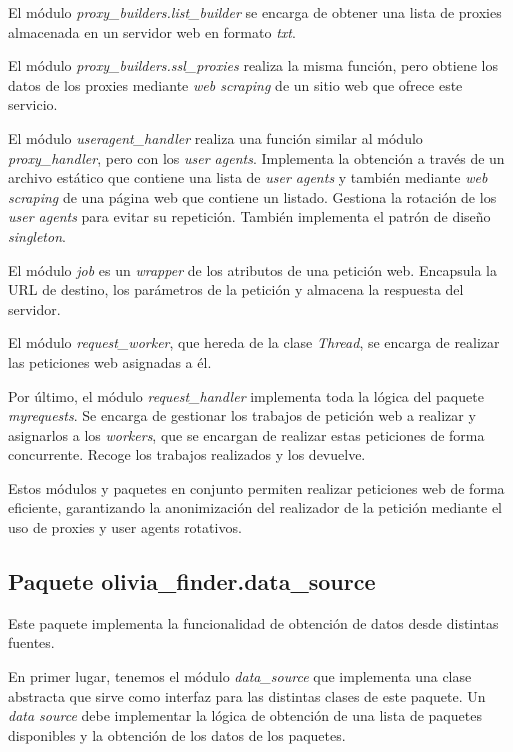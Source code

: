 El módulo \textit{proxy\_builders.list\_builder} se encarga de obtener una lista de proxies almacenada en un
 servidor web en formato \textit{txt}.

El módulo \textit{proxy\_builders.ssl\_proxies} realiza la misma función, pero obtiene los datos de los 
proxies mediante \textit{web scraping} de un sitio web que ofrece este servicio.

El módulo \textit{useragent\_handler} realiza una función similar al 
módulo \textit{proxy\_handler}, pero con los \textit{user agents}. Implementa la obtención a 
través de un archivo estático que contiene una lista de \textit{user agents} y también mediante \textit{web scraping} de una página web que contiene un listado. Gestiona la rotación de los \textit{user agents} para evitar su repetición. También implementa el patrón de diseño \textit{singleton}.

El módulo \textit{job} es un \textit{wrapper} de los atributos de una petición web. 
Encapsula la URL de destino, los parámetros de la petición y almacena la respuesta del servidor.

El módulo \textit{request\_worker}, que hereda de la clase \textit{Thread}, se encarga de 
realizar las peticiones web asignadas a él.

Por último, el módulo \textit{request\_handler} implementa toda la lógica del 
paquete \textit{myrequests}. Se encarga de gestionar los trabajos de petición web a realizar y 
asignarlos a los \textit{workers}, que se encargan de realizar estas peticiones de forma concurrente. 
Recoge los trabajos realizados y los devuelve.

Estos módulos y paquetes en conjunto permiten realizar peticiones web de forma eficiente, 
garantizando la anonimización del realizador de la petición mediante el uso de proxies y user 
agents rotativos.

\subsection{Paquete olivia\_finder.data\_source}

Este paquete implementa la funcionalidad de obtención de datos desde distintas fuentes.

En primer lugar, tenemos el módulo \textit{data\_source} que implementa una clase abstracta que 
sirve como interfaz para las distintas clases de este paquete. Un \textit{data source} debe implementar
 la lógica de obtención de una lista de paquetes disponibles y la obtención de los datos de los paquetes.

